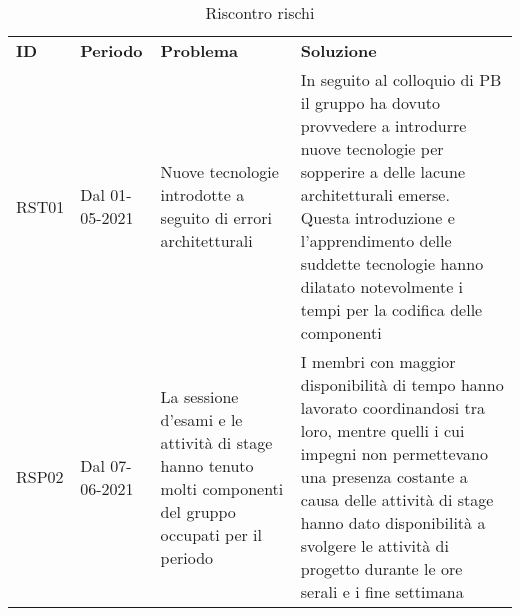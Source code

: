 \newpage

\begin{table} [!ht]
	\begin{center}
		\begin{tabular} { m{1cm} m{3cm} m{5cm} m{6cm} }
			\rowcolor{lightgray}
			\textbf{ID} & \textbf{Periodo} & \textbf{Problema} & \textbf{Soluzione}\\
			
			RST01 & Dal 01-05-2021 & Nuove tecnologie introdotte a seguito di errori architetturali & In seguito al colloquio di PB il gruppo ha dovuto provvedere a introdurre nuove tecnologie per sopperire a delle lacune architetturali emerse. Questa introduzione e l'apprendimento delle suddette tecnologie hanno dilatato notevolmente i tempi per la codifica delle componenti \\	
			
			RSP02 & Dal 07-06-2021 & La sessione d'esami e le attività di stage hanno tenuto molti componenti del gruppo occupati per il periodo & I membri con maggior disponibilità di tempo hanno lavorato coordinandosi tra loro, mentre quelli i cui impegni non permettevano una presenza costante a causa delle attività di stage hanno dato disponibilità a svolgere le attività di progetto durante le ore serali e i fine settimana \\	
					
		\end{tabular}
	\end{center}
\caption{Riscontro rischi}
\end{table}

	

\newpage